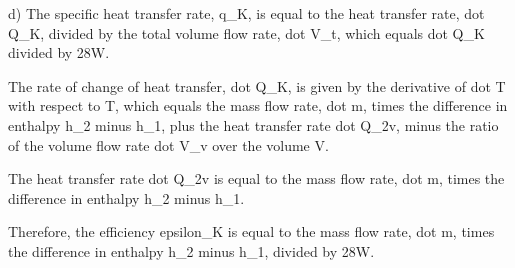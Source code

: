 d) The specific heat transfer rate, q_K, is equal to the heat transfer rate, dot Q_K, divided by the total volume flow rate, dot V_t, which equals dot Q_K divided by 28W.

The rate of change of heat transfer, dot Q_K, is given by the derivative of dot T with respect to T, which equals the mass flow rate, dot m, times the difference in enthalpy h_2 minus h_1, plus the heat transfer rate dot Q_2v, minus the ratio of the volume flow rate dot V_v over the volume V.

The heat transfer rate dot Q_2v is equal to the mass flow rate, dot m, times the difference in enthalpy h_2 minus h_1.

Therefore, the efficiency epsilon_K is equal to the mass flow rate, dot m, times the difference in enthalpy h_2 minus h_1, divided by 28W.
